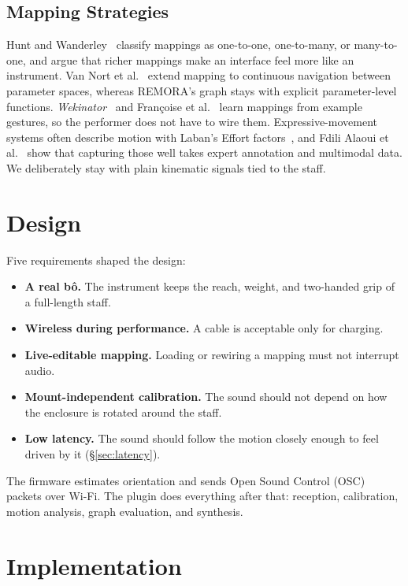 \documentclass[sigconf,nonacm]{acmart}
\begin{document}
\subsection{Mapping Strategies}
Hunt and Wanderley~\cite{hunt2002mapping} classify mappings as one-to-one, one-to-many, or
many-to-one, and argue that richer mappings make an interface feel more like an instrument. Van Nort
et al.~\cite{vannort2014mapping} extend mapping to continuous navigation between parameter spaces,
whereas REMORA's graph stays with explicit parameter-level functions.
\textit{Wekinator}~\cite{fiebrink2010wekinator} and Fran\c{c}oise et
al.~\cite{francoise2014probabilistic} learn mappings from example gestures, so the performer does
not have to wire them. Expressive-movement systems often describe motion with Laban's Effort
factors~\cite{camurri2000eyesweb,schacher2010motiontogesture}, and Fdili Alaoui et
al.~\cite{fdilialaoui2017laban} show that capturing those well takes expert annotation and
multimodal data. We deliberately stay with plain kinematic signals tied to the staff.

\section{Design}
Five requirements shaped the design:
\begin{itemize}
\item \textbf{A real b\^o.} The instrument keeps the reach, weight, and two-handed grip of a
full-length staff.
\item \textbf{Wireless during performance.} A cable is acceptable only for charging.
\item \textbf{Live-editable mapping.} Loading or rewiring a mapping must not interrupt audio.
\item \textbf{Mount-independent calibration.} The sound should not depend on how the enclosure is
rotated around the staff.
\item \textbf{Low latency.} The sound should follow the motion closely enough to feel driven by it
(\S\ref{sec:latency}).
\end{itemize}
The firmware estimates orientation and sends Open Sound Control (OSC) packets over Wi-Fi. The plugin
does everything after that: reception, calibration, motion analysis, graph evaluation, and
synthesis.

\section{Implementation}
\end{document}
